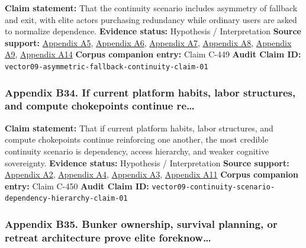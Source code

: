 \documentclass[
  american,
  11pt,
  letterpaper,
]{article}
\begin{document}
\textbf{Claim statement:} That the continuity scenario includes
asymmetry of fallback and exit, with elite actors purchasing redundancy
while ordinary users are asked to normalize dependence. \textbf{Evidence
status:} Hypothesis / Interpretation \textbf{Source support:}
\hyperref[ch-09-appendix-a5-sam-altman-s-manifest-destiny]{Appendix A5},
\hyperref[ch-09-appendix-a6-inside-mark-zuckerbergs-top-secret-hawaii-compound]{Appendix
A6},
\hyperref[ch-09-appendix-a7-mark-zuckerberg-downplays-his-5-000-square-foot-underground-bunker-in-hawaii-just-a-little-shelter]{Appendix
A7},
\hyperref[ch-09-appendix-a8-why-silicon-valley-billionaires-are-prepping-for-the-apocalypse-in-new-zealand]{Appendix
A8},
\hyperref[ch-09-appendix-a9-new-zealand-woos-the-wealthy-with-golden-visa-changes]{Appendix
A9},
\hyperref[ch-09-appendix-a14-the-digital-sovereignty-imperative]{Appendix
A14} \textbf{Corpus companion entry:} Claim C-449 \textbf{Audit Claim
ID:} \texttt{vector09-asymmetric-fallback-continuity-claim-01}

\subsubsection{Appendix B34. If current platform habits, labor
structures, and compute chokepoints continue
re\ldots{}}\label{ch-09-appendix-b34-if-current-platform-habits-labor-structures-and-compute-chokepoints-continue-re}

\textbf{Claim statement:} That if current platform habits, labor
structures, and compute chokepoints continue reinforcing one another,
the most credible continuity scenario is dependency, access hierarchy,
and weaker cognitive sovereignty. \textbf{Evidence status:} Hypothesis /
Interpretation \textbf{Source support:}
\hyperref[ch-09-appendix-a2-gpts-are-gpts-an-early-look-at-the-labor-market-impact-potential-of-large-language-models]{Appendix
A2},
\hyperref[ch-09-appendix-a4-gen-ai-artificial-intelligence-and-the-future-of-work]{Appendix
A4},
\hyperref[ch-09-appendix-a3-computing-power-and-the-governance-of-artificial-intelligence]{Appendix
A3},
\hyperref[ch-09-appendix-a11-the-adolescence-of-technology]{Appendix
A11} \textbf{Corpus companion entry:} Claim C-450 \textbf{Audit Claim
ID:} \texttt{vector09-continuity-scenario-dependency-hierarchy-claim-01}

\subsubsection{Appendix B35. Bunker ownership, survival planning, or
retreat architecture prove elite
foreknow\ldots{}}\label{ch-09-appendix-b35-bunker-ownership-survival-planning-or-retreat-architecture-prove-elite-foreknow}
\end{document}
